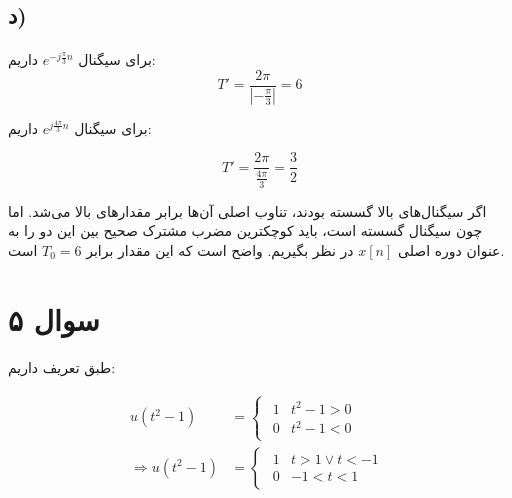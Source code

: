 \documentclass{article}
\begin{document}
	\subsection*{د)}
	\paragraph*{}
	برای سیگنال
	$e^{-j \frac{\pi}{3} n}$
	داریم:
	\begin{equation*}
		T' = \frac{2 \pi}{\left|-\frac{\pi}{3}\right|} = 6
	\end{equation*}

	برای سیگنال
	$e^{j \frac{4 \pi}{3} n}$
	داریم:

	\begin{equation*}
		T' = \frac{2 \pi}{\frac{4 \pi}{3}} = \frac{3}{2}
	\end{equation*}

	اگر سیگنال‌های بالا گسسته بودند، تناوب اصلی آن‌ها برابر مقدارهای بالا می‌شد. اما چون سیگنال گسسته است، باید کوچکترین مضرب مشترک صحیح بین این دو را به عنوان دوره اصلی
	$x[n]$
	در نظر بگیریم. واضح است که این مقدار برابر
	$T_0 = 6$
	است.



	\section*{سوال ۵}
	\paragraph*{}
	طبق تعریف داریم:

	\begin{align*}
		u(t^2 - 1) &=
		\begin{cases}
			\begin{matrix}
				1 & t^2 - 1 > 0 \\
				0 & t^2 - 1 < 0
			\end{matrix}
		\end{cases} \\
		\Rightarrow
		u(t^2 - 1) &=
		\begin{cases}
			\begin{matrix}
				1 & t > 1 \lor t < -1 \\
				0 & -1 < t < 1
			\end{matrix}
		\end{cases} \\
	\end{align*}
\end{document}
